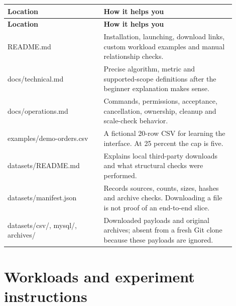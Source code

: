 \begin{longtable}{>{\RaggedRight\arraybackslash}p{0.38\linewidth}>{\RaggedRight\arraybackslash}p{0.52\linewidth}}
\toprule
\textbf{Location} & \textbf{How it helps you} \\
\midrule
\endfirsthead
\toprule
\textbf{Location} & \textbf{How it helps you} \\
\midrule
\endhead
README.md & Installation, launching, download links, custom workload examples and manual relationship checks. \\[5pt]
docs/technical.md & Precise algorithm, metric and supported-scope definitions after the beginner explanation makes sense. \\[5pt]
docs/operations.md & Commands, permissions, acceptance, cancellation, ownership, cleanup and scale-check behavior. \\[5pt]
examples/demo-orders.csv & A fictional 20-row CSV for learning the interface. At 25 percent the cap is five. \\[5pt]
datasets/README.md & Explains local third-party downloads and what structural checks were performed. \\[5pt]
datasets/manifest.json & Records sources, counts, sizes, hashes and archive checks. Downloading a file is not proof of an end-to-end slice. \\[5pt]
datasets/csv/, mysql/, archives/ & Downloaded payloads and original archives; absent from a fresh Git clone because these payloads are ignored. \\[5pt]
\bottomrule
\end{longtable}

\section{Workloads and experiment instructions}

